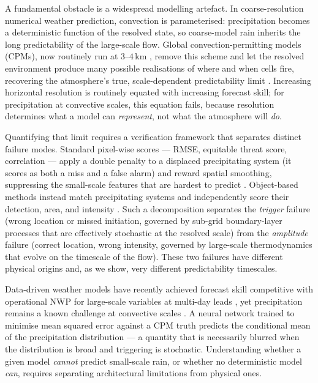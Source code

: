 \documentclass[11pt]{article}
\begin{document}
A fundamental obstacle is a widespread modelling artefact.
In coarse-resolution numerical weather prediction, convection is parameterised:
precipitation becomes a deterministic function of the resolved state, so
coarse-model rain inherits the long predictability of the large-scale flow.
Global convection-permitting models (CPMs), now routinely run at $3$--$4$\,km
\citep{satoh2019global, stevens2019dyamond}, remove this scheme and let the
resolved environment produce many possible realisations of where and when cells
fire, recovering the atmosphere's true, scale-dependent predictability limit
\citep{lorenz1969predictability, zhang2007mesoscale, judt2018insights,
hohenegger2007predictability}.
Increasing horizontal resolution is routinely equated with increasing forecast
skill; for precipitation at convective scales, this equation fails, because
resolution determines what a model can \emph{represent}, not what the
atmosphere will \emph{do}.

Quantifying that limit requires a verification framework that separates
distinct failure modes.
Standard pixel-wise scores --- RMSE, equitable threat score, correlation ---
apply a double penalty to a displaced precipitating system (it scores as
both a miss and a false alarm) and reward spatial smoothing, suppressing the
small-scale features that are hardest to predict \citep{gilleland2009}.
Object-based methods instead match precipitating systems and independently
score their detection, area, and intensity \citep{davis2006}.
Such a decomposition separates the \emph{trigger} failure (wrong location or
missed initiation, governed by sub-grid boundary-layer processes that are
effectively stochastic at the resolved scale) from the \emph{amplitude}
failure (correct location, wrong intensity, governed by large-scale
thermodynamics that evolve on the timescale of the flow).
These two failures have different physical origins and, as we show, very
different predictability timescales.

Data-driven weather models have recently achieved forecast skill competitive
with operational NWP for large-scale variables at multi-day leads
\citep{lam2023graphcast}, yet precipitation remains a known challenge at
convective scales \citep{ravuri2021}.
A neural network trained to minimise mean squared error against a CPM truth
predicts the conditional mean of the precipitation distribution --- a quantity
that is necessarily blurred when the distribution is broad and triggering is
stochastic.
Understanding whether a given model \emph{cannot} predict small-scale rain, or
whether no deterministic model \emph{can}, requires separating architectural
limitations from physical ones.
\end{document}
